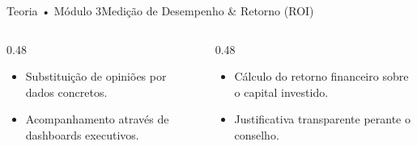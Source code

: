 \begin{senaiframe}{Teoria • Módulo 3}{Medição de Desempenho \& Retorno (ROI)}
  \begin{columns}[t]
    \begin{column}{0.48\textwidth}
      \begin{tcolorbox}[senaibluecard, title={Medição Objetiva}]
        \begin{itemize}
          \item Substituição de opiniões por dados concretos.
          \item Acompanhamento através de dashboards executivos.
        \end{itemize}
      \end{tcolorbox}
    \end{column}
    \begin{column}{0.48\textwidth}
      \begin{tcolorbox}[senaigreencard, title={Demostração do ROI}]
        \begin{itemize}
          \item Cálculo do retorno financeiro sobre o capital investido.
          \item Justificativa transparente perante o conselho.
        \end{itemize}
      \end{tcolorbox}
    \end{column}
  \end{columns}
\end{senaiframe}

